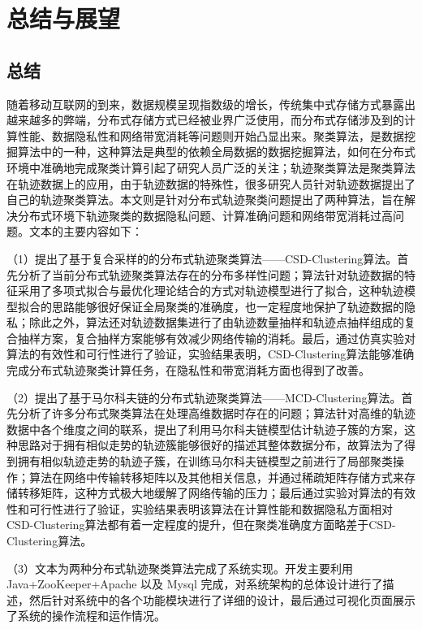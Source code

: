 \chapter{总结与展望}

\section{总结}

随着移动互联网的到来，数据规模呈现指数级的增长，传统集中式存储方式暴露出越来越多的弊端，分布式存储方式已经被业界广泛使用，而分布式存储涉及到的计算性能、数据隐私性和网络带宽消耗等问题则开始凸显出来。聚类算法，是数据挖掘算法中的一种，这种算法是典型的依赖全局数据的数据挖掘算法，如何在分布式环境中准确地完成聚类计算引起了研究人员广泛的关注；轨迹聚类算法是聚类算法在轨迹数据上的应用，由于轨迹数据的特殊性，很多研究人员针对轨迹数据提出了自己的轨迹聚类算法。本文则是针对分布式轨迹聚类问题提出了两种算法，旨在解决分布式环境下轨迹聚类的数据隐私问题、计算准确问题和网络带宽消耗过高问题。文本的主要内容如下：

（1）提出了基于复合采样的的分布式轨迹聚类算法——CSD-Clustering算法。首先分析了当前分布式轨迹聚类算法存在的分布多样性问题；算法针对轨迹数据的特征采用了多项式拟合与最优化理论结合的方式对轨迹模型进行了拟合，这种轨迹模型拟合的思路能够很好保证全局聚类的准确度，也一定程度地保护了轨迹数据的隐私；除此之外，算法还对轨迹数据集进行了由轨迹数量抽样和轨迹点抽样组成的复合抽样方案，复合抽样方案能够有效减少网络传输的消耗。最后，通过仿真实验对算法的有效性和可行性进行了验证，实验结果表明，CSD-Clustering算法能够准确完成分布式轨迹聚类计算任务，在隐私性和带宽消耗方面也得到了改善。

（2）提出了基于马尔科夫链的分布式轨迹聚类算法——MCD-Clustering算法。首先分析了许多分布式聚类算法在处理高维数据时存在的问题；算法针对高维的轨迹数据中各个维度之间的联系，提出了利用马尔科夫链模型估计轨迹子簇的方案，这种思路对于拥有相似走势的轨迹簇能够很好的描述其整体数据分布，故算法为了得到拥有相似轨迹走势的轨迹子簇，在训练马尔科夫链模型之前进行了局部聚类操作；算法在网络中传输转移矩阵以及其他相关信息，并通过稀疏矩阵存储方式来存储转移矩阵，这种方式极大地缓解了网络传输的压力；最后通过实验对算法的有效性和可行性进行了验证，实验结果表明该算法在计算性能和数据隐私方面相对CSD-Clustering算法都有着一定程度的提升，但在聚类准确度方面略差于CSD-Clustering算法。

（3）文本为两种分布式轨迹聚类算法完成了系统实现。开发主要利用 Java+ZooKeeper+Apache 以及 Mysql 完成，对系统架构的总体设计进行了描述，然后针对系统中的各个功能模块进行了详细的设计，最后通过可视化页面展示了系统的操作流程和运作情况。

